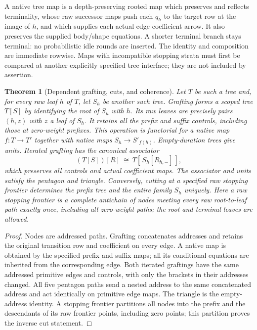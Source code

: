 \documentclass[11pt]{article}
\newtheorem{theorem}{Theorem}\newtheorem{proposition}[theorem]{Proposition}\newtheorem{definition}[theorem]{Definition}
\begin{document}
A native tree map is a depth-preserving rooted map which preserves and reflects terminality, whose raw successor maps push each $q_h$ to the target row at the image of $h$, and which supplies each actual edge coefficient arrow. It also preserves the supplied body/shape equations. A shorter terminal branch stays terminal: no probabilistic idle rounds are inserted. The identity and composition are immediate rowwise. Maps with incompatible stopping strata must first be compared at another explicitly specified tree interface; they are not included by assertion.

\begin{theorem}[Dependent grafting, cuts, and coherence]
Let $T$ be such a tree and, for every raw leaf $h$ of $T$, let $S_h$ be another such tree. Grafting forms a scoped tree $T[S]$ by identifying the root of $S_h$ with $h$. Its raw leaves are precisely pairs $(h,z)$ with $z$ a leaf of $S_h$. It retains all the prefix and suffix controls, including those at zero-weight prefixes. This operation is functorial for a native map $f:T\to T'$ together with native maps $S_h\to S'_{f(h)}$. Empty-duration trees give units. Iterated grafting has the canonical associator
\[
 (T[S])[R]\ \cong\ T[\,S_h[R_{h,-}]\,],
\]
which preserves all controls and actual coefficient maps. The associator and units satisfy the pentagon and triangle. Conversely, cutting at a specified raw stopping frontier determines the prefix tree and the entire family $S_h$ uniquely. Here a raw stopping frontier is a complete antichain of nodes meeting every raw root-to-leaf path exactly once, including all zero-weight paths; the root and terminal leaves are allowed.
\end{theorem}
\begin{proof}
Nodes are addressed paths. Grafting concatenates addresses and retains the original transition row and coefficient on every edge. A native map is obtained by the specified prefix and suffix maps; all its conditional equations are inherited from the corresponding edge. Both iterated graftings have the same addressed primitive edges and controls, with only the brackets in their addresses changed. All five pentagon paths send a nested address to the same concatenated address and act identically on primitive edge maps. The triangle is the empty-address identity. A stopping frontier partitions all nodes into the prefix and the descendants of its raw frontier points, including zero points; this partition proves the inverse cut statement.\end{proof}
\end{document}
